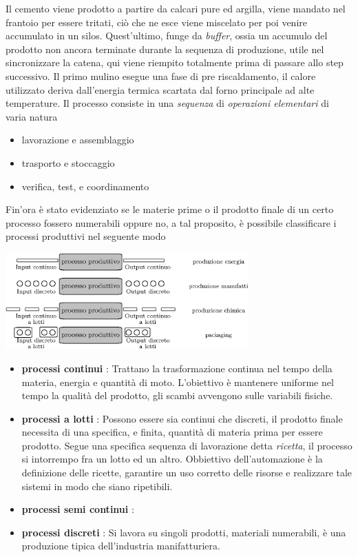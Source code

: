 \documentclass[10pt, letterpaper]{report}
\begin{document}
Il cemento viene prodotto a partire da calcari pure ed argilla, viene mandato nel frantoio per essere 
tritati, ciò che ne esce viene miscelato per poi venire accumulato in un silos. Quest'ultimo, funge 
da \textit{buffer}, ossia un accumulo del prodotto non ancora terminate durante la sequenza di produzione, utile 
nel sincronizzare la catena, qui 
viene riempito totalmente prima di passare allo step successivo. Il primo mulino esegue una fase 
di pre riscaldamento, il calore utilizzato deriva dall'energia termica scartata dal forno principale 
ad alte temperature. \acc 
Il processo consiste in una \textit{sequenza} di \textit{operazioni elementari} di varia natura \begin{itemize}
    \item lavorazione  e assemblaggio
    \item trasporto e stoccaggio 
    \item verifica, test, e coordinamento
\end{itemize}
Fin'ora è stato evidenziato se le materie prime o il prodotto finale di un certo processo fossero 
numerabili oppure no, a tal proposito, è possibile classificare i processi produttivi nel seguente 
modo
\begin{center}
    \includegraphics[width=0.7\textwidth ]{images/classificazioneProcProd.eps}
\end{center}
\begin{itemize}
    \item\textbf{processi continui} : Trattano la trasformazione continua nel tempo della materia, energia 
    e quantità di moto. L'obiettivo è mantenere uniforme nel tempo la qualità del prodotto, gli scambi 
    avvengono sulle variabili fisiche.
    \item\textbf{processi a lotti} : Possono essere sia continui che discreti, il prodotto finale necessita 
    di una specifica, e finita, quantità di materia prima per essere prodotto. Segue una specifica 
    sequenza di lavorazione detta \textit{ricetta}, il processo si intorrempo fra un lotto ed un 
    altro. Obbiettivo dell'automazione è la definizione delle ricette, garantire un uso corretto delle 
    risorse e realizzare tale sistemi in modo che siano ripetibili.
    \item\textbf{processi semi continui} :  
    \item \textbf{processi discreti} : Si lavora su singoli prodotti, materiali numerabili, è una 
    produzione tipica dell'industria manifatturiera.
\end{itemize}
\end{document}
